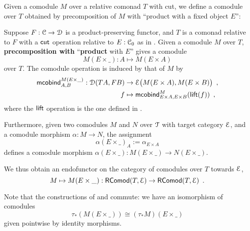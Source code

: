 \documentclass[a4paper,USenglish]{lipics}
\newcommand{\fat}[1]{\textbf{#1}}
\begin{document}
Given a comodule $M$ over a relative comonad $T$ with cut, we define a comodule over $T$ obtained by precomposition of $M$ with
\enquote{product with a fixed object $E$}:


\begin{defn}%
\label{def:product_in_context}
 Suppose $F:{\mathcal{C}}\to\mathcal{D}$ is a product-preserving functor, and $T$ is a comonad relative to $F$ with a $\mathsf{cut}$ operation 
 relative to $E:{\mathcal{C}}_0$ as in .
 Given a comodule $M$ over $T$,  \fat{precomposition with} \enquote{\fat{product} with $E$}
 gives a comodule 
   \[ M(E\times\_) : A \mapsto M(E\times A) \] over $T$.
 The comodule operation is induced by that of $M$ by 
 \begin{align*} \mathsf{mcobind}^{M(E\times\_)}_{A,B} : \mathcal{D}(TA,FB)&\to \mathcal{E}\bigl(M(E\times A), M(E\times B)\bigr) \enspace ,\\ 
                                                      f &\mapsto \mathsf{mcobind}^M_{E\times A,E\times B}(\mathsf{lift}(f)) \enspace ,
  \end{align*}                                        
where the $\mathsf{lift}$ operation is the one defined in .
 
 Furthermore, given two comodules $M$ and $N$ over $\mathcal{T}$ with target category $\mathcal{E}$, and a comodule morphism $\alpha : M \to N$,  
 the assignment \[ \alpha(E \times \_)_A := \alpha_{E\times A} \] defines a comodule morphism 
  $\alpha(E\times \_) : M(E\times \_) \to N(E\times \_) $.

\begin{Long}
  \noindent
  We thus obtain an endofunctor on the category of comodules over $T$ towards $\mathcal{E}$,
   \[ M \mapsto  M (E\times \_) : \mathsf{RComod}(T,\mathcal{E}) \to \mathsf{RComod}(T,\mathcal{E}) \enspace . \]
\end{Long}
\end{defn}



\begin{rem}\label{rem:prod_pullback_commute}
 Note that the constructions of  and  commute:
 we have an isomorphism of comodules 
  \[     \tau_*(M(E\times \_)) \cong (\tau_*M)(E \times \_)        \]
 given pointwise by identity morphisms.
\end{rem}
\end{document}
